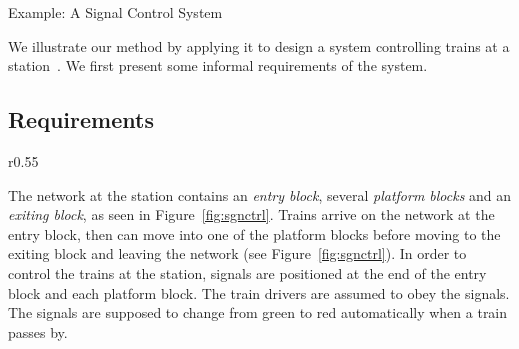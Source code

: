 \newcommand{\PREAMBLE}

\section{Example: A Signal Control System}
\label{sec:example}

We illustrate our method by applying it to design a system controlling
trains at a
station~\cite{hudon11:_devel_contr_system_guided_model_envir}.  We
first present some informal requirements of the system.

\subsection{Requirements}
\label{sec:requirements}

\begin{wrapfigure}{r}{0.55\linewidth}
  \centering 
  \caption{A signal control system}
  \label{fig:sgnctrl}
\end{wrapfigure}

The network at the station contains an \emph{entry block}, several
\emph{platform blocks} and an \emph{exiting block}, as seen in
Figure~\ref{fig:sgnctrl}.  Trains arrive on the network at the entry
block, then can move into one of the platform blocks before moving to
the exiting block and leaving the network (see Figure~\ref{fig:sgnctrl}).
In order to control the trains at the station, signals are positioned
at the end of the entry block and each platform block.  The
train drivers are assumed to obey the signals.  The signals are
supposed to change from green to red automatically when a train passes by.

